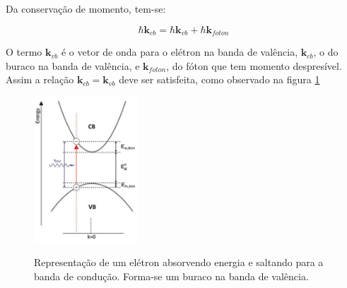  		\par Da conservação de momento, tem-se:

 		\begin{equation}
 			\label{bandas_2}
 			\hbar \mathbf{k}_{cb} = \hbar \mathbf{k}_{vb} + \hbar \mathbf{k}_{foton}
 		\end{equation}

 		\par O termo $\mathbf{k}_{vb}$ é o vetor de onda para o elétron na banda de valência, $\mathbf{k}_{cb}$, o do buraco na banda de valência, e $\mathbf{k}_{foton}$, do fóton que tem momento despresível. Assim a relação $\mathbf{k}_{cb} = \mathbf{k}_{vb}$ deve ser satisfeita, como observado na figura \ref{fig8}

 		\begin{figure}[H]
	      \caption{Representação de um elétron absorvendo energia e saltando para a banda de condução. Forma-se um buraco na banda de valência.}
	      \centering
	      \includegraphics[width=0.35\textwidth]{images/figura8.jpg}
	      \label{fig8}
	    \end{figure}
